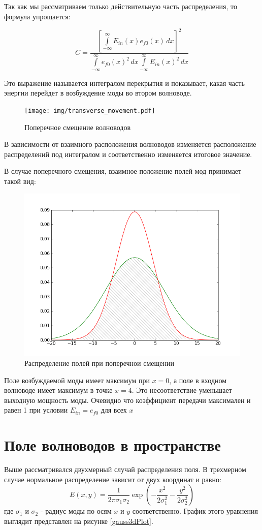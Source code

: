Так как мы рассматриваем только действительную часть распределения, то формула упрощается:

\begin{equation}
	\label{coupling}
	C = \frac{\left[\int\limits_{-\infty}^{\infty}E_{in}(x)e_{f0}(x) \,dx\right]^2}
	{\int\limits_{-\infty}^{\infty}e_{f0}(x)^2 \,dx
	 \int\limits_{-\infty}^{\infty}E_{in}(x)^2 \,dx}
\end{equation}

Это выражение называется интегралом перекрытия  и показывает, какая часть энергии перейдет в возбуждение моды во втором волноводе. 

\begin{figure}[h!]
	\texttt{[image: img/transverse\_movement.pdf]}
	\caption{Поперечное смещение волноводов}
\end{figure}

В зависимости от взаимного расположения волноводов изменяется расположение распределений под интегралом и соответственно изменяется итоговое значение.

В случае поперечного смещения, взаимное положение полей мод принимает такой вид:

\begin{figure}[h!]
	\includegraphics[width=.5\textwidth]{img/intersection.png}
	\caption{Распределение полей при поперечнои смещении}
\end{figure}

Поле возбуждаемой моды имеет максимум при $x=0$, а поле в входном волноводе имеет максимум в точке $x=4$. Это несоответствие уменьшает выходную мощность моды. Очевидно что коэффициент передачи максимален и равен 1 при условии $E_{in} = e_{f0}$ для всех $x$

\section{Поле волноводов в пространстве}

Выше рассматривался двухмерный случай распределения поля. В трехмерном случае нормальное распределение зависит от двух координат и равно:
\begin{equation}
  \label{gauss3d}
  E(x,y)=\frac{1}{2\pi\sigma_1\sigma_2}\exp\left(-\frac{x^2}{2\sigma_1^2}-\frac{y^2}{2\sigma_2^2}\right)
\end{equation}
где $\sigma_1$ и $\sigma_2$ - радиус моды по осям $x$ и $y$ соответственно. График этого уравнения выглядит представлен на рисунке \ref{gauss3dPlot}.

